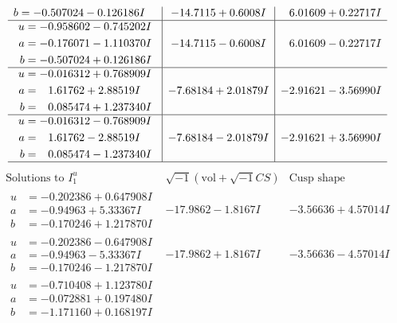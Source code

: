\documentclass[1p]{elsarticle_modified}
\theoremstyle{definition}
\newcommand{\I}{\sqrt{-1}}
\begin{document}
$$\begin{array}{c|c|c}
\begin{aligned}
b &= -0.507024 - 0.126186 I\end{aligned}
 & -14.7115 + 0.6008 I & \phantom{-}6.01609 + 0.22717 I \\ \hline\begin{aligned}
u &= -0.958602 - 0.745202 I \\
a &= -0.176071 - 1.110370 I \\
b &= -0.507024 + 0.126186 I\end{aligned}
 & -14.7115 - 0.6008 I & \phantom{-}6.01609 - 0.22717 I \\ \hline\begin{aligned}
u &= -0.016312 + 0.768909 I \\
a &= \phantom{-}1.61762 + 2.88519 I \\
b &= \phantom{-}0.085474 + 1.237340 I\end{aligned}
 & -7.68184 + 2.01879 I & -2.91621 - 3.56990 I \\ \hline\begin{aligned}
u &= -0.016312 - 0.768909 I \\
a &= \phantom{-}1.61762 - 2.88519 I \\
b &= \phantom{-}0.085474 - 1.237340 I\end{aligned}
 & -7.68184 - 2.01879 I & -2.91621 + 3.56990 I\\
 \hline 
 \end{array}$$\newpage$$\begin{array}{c|c|c}  
\text{Solutions to }I^u_{1}& \I (\text{vol} + \sqrt{-1}CS) & \text{Cusp shape}\\
 \hline 
\begin{aligned}
u &= -0.202386 + 0.647908 I \\
a &= -0.94963 + 5.33367 I \\
b &= -0.170246 + 1.217870 I\end{aligned}
 & -17.9862 - 1.8167 I & -3.56636 + 4.57014 I \\ \hline\begin{aligned}
u &= -0.202386 - 0.647908 I \\
a &= -0.94963 - 5.33367 I \\
b &= -0.170246 - 1.217870 I\end{aligned}
 & -17.9862 + 1.8167 I & -3.56636 - 4.57014 I \\ \hline\begin{aligned}
u &= -0.710408 + 1.123780 I \\
a &= -0.072881 + 0.197480 I \\
b &= -1.171160 + 0.168197 I\end{aligned}

\end{array}$$
\end{document}
